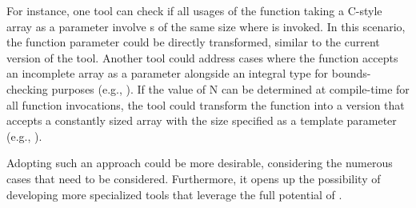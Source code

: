 For instance, one tool can check if all usages of the function taking a C-style array as a parameter involve s of the same size where  is invoked. In this scenario, the function parameter could be directly transformed, similar to the current version of the tool. 
Another tool could address cases where the function accepts an incomplete array as a parameter alongside an integral type for bounds-checking purposes (e.g., ).
If the value of N can be determined at compile-time for all function invocations, the tool could transform the function into a version that accepts a constantly sized array with the size specified as a template parameter (e.g., ).

Adopting such an approach could be more desirable, considering the numerous cases that need to be considered.
Furthermore, it opens up the possibility of developing more specialized tools that leverage the full potential of .